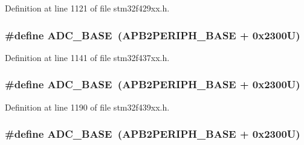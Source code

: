 Definition at line 1121 of file stm32f429xx.\+h.

\subsubsection[{\texorpdfstring{A\+D\+C\+\_\+\+B\+A\+SE}{ADC_BASE}}]{\setlength{\rightskip}{0pt plus 5cm}\#define A\+D\+C\+\_\+\+B\+A\+SE~({\bf A\+P\+B2\+P\+E\+R\+I\+P\+H\+\_\+\+B\+A\+SE} + 0x2300\+U)}\hypertarget{group___peripheral__memory__map_gad06cb9e5985bd216a376f26f22303cd6}{}\label{group___peripheral__memory__map_gad06cb9e5985bd216a376f26f22303cd6}


Definition at line 1141 of file stm32f437xx.\+h.

\subsubsection[{\texorpdfstring{A\+D\+C\+\_\+\+B\+A\+SE}{ADC_BASE}}]{\setlength{\rightskip}{0pt plus 5cm}\#define A\+D\+C\+\_\+\+B\+A\+SE~({\bf A\+P\+B2\+P\+E\+R\+I\+P\+H\+\_\+\+B\+A\+SE} + 0x2300\+U)}\hypertarget{group___peripheral__memory__map_gad06cb9e5985bd216a376f26f22303cd6}{}\label{group___peripheral__memory__map_gad06cb9e5985bd216a376f26f22303cd6}


Definition at line 1190 of file stm32f439xx.\+h.

\subsubsection[{\texorpdfstring{A\+D\+C\+\_\+\+B\+A\+SE}{ADC_BASE}}]{\setlength{\rightskip}{0pt plus 5cm}\#define A\+D\+C\+\_\+\+B\+A\+SE~({\bf A\+P\+B2\+P\+E\+R\+I\+P\+H\+\_\+\+B\+A\+SE} + 0x2300\+U)}\hypertarget{group___peripheral__memory__map_gad06cb9e5985bd216a376f26f22303cd6}{}\label{group___peripheral__memory__map_gad06cb9e5985bd216a376f26f22303cd6}


